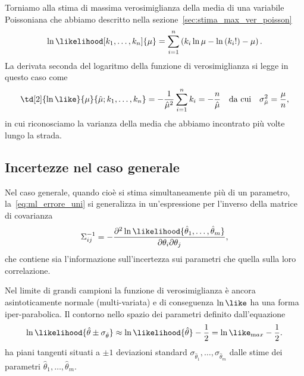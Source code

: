 \begin{examplebox}
  \begin{example}
    Torniamo alla stima di massima verosimiglianza della media di una variabile
    Poissoniana che abbiamo descritto nella
    sezione~\ref{sec:stima_max_ver_poisson}
    \begin{align*}
      \ln\likelihood[k_1,\ldots,k_n]{\mu} =
      \sum_{i = 1}^n \left( k_i \ln \mu - \ln\left( k_i! \right) - \mu \right).
    \end{align*}
    La derivata seconda del logaritmo della funzione di verosimiglianza si
    legge in questo caso come
    \begin{align*}
      \td[2]{\ln\like}{\mu}{\hat\mu;k_1,\ldots,k_n} =
      -\frac{1}{\hat\mu^2}\sum_{i = 1}^n k_i = -\frac{n}{\hat\mu}
      \quad \text{da cui} \quad \sigma_{\hat\mu}^2 = \frac{\mu}{n},
    \end{align*}
    in cui riconosciamo la varianza della media che abbiamo incontrato
    più volte lungo la strada.
  \end{example}
\end{examplebox}


\subsection{Incertezze nel caso generale}

Nel caso generale, quando cioè si stima simultaneamente più di un parametro,
la~\eqref{eq:ml_errore_uni} si generalizza in un'espressione per l'inverso
della matrice di covarianza
\begin{align}
  \Sigma^{-1}_{ij} =
  - \frac{\partial^2\ln\likelihood{\hat\theta_1,\ldots,\hat\theta_m}}
  {\partial\theta_i \partial\theta_j},
\end{align}
che contiene sia l'informazione sull'incertezza sui parametri che quella
sulla loro correlazione.

Nel limite di grandi campioni la funzione di verosimiglianza è ancora
asintoticamente normale (multi-variata) e di conseguenza $\ln\like$ ha una forma
iper-parabolica. Il contorno nello spazio dei parametri definito dall'equazione
\begin{align}
  \ln\likelihood{\hat\theta \pm \sigma_{\hat\theta}} \approx
  \ln\likelihood{\hat\theta} - \frac{1}{2} = \ln\like_{\mathrm max} - \frac{1}{2}.
\end{align}
ha piani tangenti situati a $\pm 1$ deviazioni standard
$\sigma_{\hat\theta_1},\ldots,\sigma_{\hat\theta_m}$ dalle stime dei parametri
$\hat\theta_1,\ldots,\hat\theta_m$.


